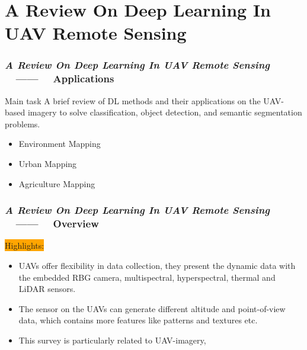 \section{A Review On Deep Learning In UAV Remote Sensing}

\begin{frame}
    \frametitle{\textit{A Review On Deep Learning In UAV Remote Sensing}
    ~~------~~ Applications}
    \begin{block}{Main task}
        A brief review of DL methods and their applications on the UAV-based imagery
        to solve classification, object detection, and semantic segmentation
        problems.
    \end{block}
    \begin{itemize}
        \item Environment Mapping
        \item Urban Mapping
        \item Agriculture Mapping
    \end{itemize}

\end{frame}

\begin{frame}
    \frametitle{\textit{A Review On Deep Learning In UAV Remote Sensing}
    ~~------~~ Overview}

    \colorbox{orange}{Highlights:}
    \begin{itemize}
        \item UAVs offer flexibility in data collection, they present the
            dynamic data with the embedded RBG camera, multispectral,
            hyperspectral, thermal and LiDAR sensors.
        \item The sensor on the UAVs can generate different altitude and
            point-of-view data, which contains more features like patterns and
            textures etc.
        \item This survey is particularly related to UAV-imagery, \color{red}{
            while some of the others focus on the DL in remote sensing but not
            UAV-based imagery.}
    \end{itemize}

\end{frame}

